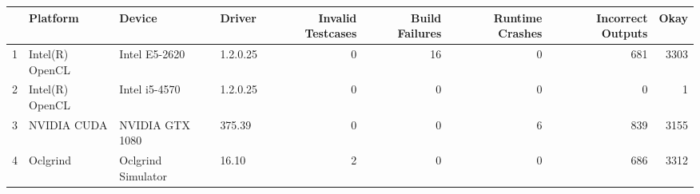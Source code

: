 \begin{tabular}{llllrrrrr}
\toprule
{} &         Platform &              Device &    Driver &  Invalid Testcases &  Build Failures &  Runtime Crashes &  Incorrect Outputs &  Okay \\
\midrule
1 &  Intel(R) OpenCL &       Intel E5-2620 &  1.2.0.25 &                  0 &              16 &                0 &                681 &  3303 \\
2 &  Intel(R) OpenCL &       Intel i5-4570 &  1.2.0.25 &                  0 &               0 &                0 &                  0 &     1 \\
3 &      NVIDIA CUDA &     NVIDIA GTX 1080 &    375.39 &                  0 &               0 &                6 &                839 &  3155 \\
4 &         Oclgrind &  Oclgrind Simulator &     16.10 &                  2 &               0 &                0 &                686 &  3312 \\
\bottomrule
\end{tabular}
